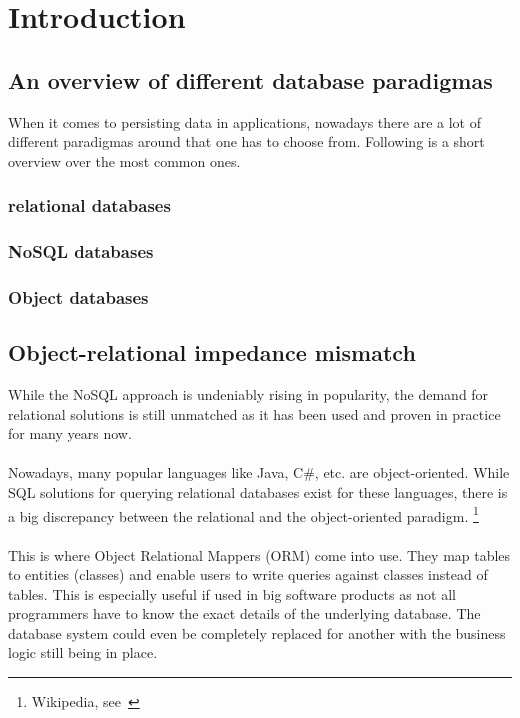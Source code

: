 \section{Introduction}\label{einleitung}

\subsection{An overview of different database paradigmas}

When it comes to persisting data in applications, nowadays there are a lot of different
paradigmas around that one has to choose from. Following is a short overview over the 
most common ones.

\subsubsection{relational databases}

\subsubsection{NoSQL databases}

\subsubsection{Object databases}

\subsection{Object-relational impedance mismatch}

While the NoSQL approach is undeniably rising in popularity, the demand for
relational solutions is still unmatched as it has been used and proven in practice
for many years now.
\\\\
Nowadays, many popular languages like Java, C\#, etc. are object-oriented.
While SQL solutions for querying relational databases exist for these languages, there is a big
discrepancy between the relational and the object-oriented paradigm. \footnote{Wikipedia, see~\cite{wiki_object_mismatch}}
\\\\
This is where Object Relational Mappers (ORM) come into use. They map tables to entities (classes) and
enable users to write queries against classes instead of tables. This is especially useful if used
in big software products as not all programmers have to know the exact details of the underlying database. The database system could even be completely replaced for another with the business logic still being in place.

